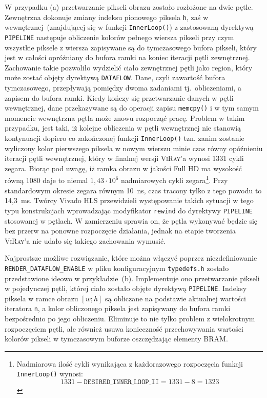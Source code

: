 \begin{enumerate}
\begin{enumerate}
\end{enumerate}
W przypadku (a) przetwarzanie pikseli obrazu zostało rozłożone na dwie pętle. Zewnętrzna dokonuje zmiany indeksu pionowego piksela \texttt{h}, zaś w wewnętrznej~(znajdującej się w funkcji \texttt{InnerLoop()}) z zastosowaną dyrektywą \texttt{PIPELINE} następuje obliczenie kolorów pełnego wiersza pikseli przy czym wszystkie piksele z wiersza zapisywane są do tymczasowego bufora pikseli, który jest w całości opróżniany do bufora ramki na koniec iteracji pętli zewnętrznej. Zachowanie takie pozwoliło wydzielić ciało zewnętrznej pętli jako region, który może zostać objęty dyrektywą \texttt{DATAFLOW}. Dane, czyli zawartość bufora tymczasowego, przepływają pomiędzy dwoma zadaniami tj.~obliczeniami, a zapisem do bufora ramki. Kiedy kończy się przetwarzanie danych w pętli wewnętrznej, dane przekazywane są do operacji zapisu \texttt{memcpy()} i w tym samym momencie wewnętrzna pętla może znowu rozpocząć pracę. Problem w takim przypadku, jest taki, iż kolejne obliczenia w pętli wewnętrznej nie stanowią kontynuacji dopiero co zakończonej funkcji \texttt{InnerLoop()} tzn. zanim zostanie wyliczony kolor pierwszego piksela w nowym wierszu minie czas równy opóźnieniu iteracji pętli wewnętrznej, który w finalnej wersji \textsc{ViRay}'a wynosi 1331 cykli zegara. Biorąc pod uwagę, iż ramka obrazu w jakości Full HD ma wysokość równą 1080 daje to niemal $1,43\cdot 10^6$ nadmiarowych cykli zegara\footnote{Nadmiarowa ilość cykli wynikająca z każdorazowego rozpoczęcia funkcji \texttt{InnerLoop()} wynosi: 
\begin{equation}
1331 - \mathtt{DESIRED\_INNER\_LOOP\_II} = 1331 - 8 = 1323
\end{equation}
}. Przy standardowym okresie zegara równym 10~ns, czas tracony tylko z tego powodu to 14,3~ms. Twórcy Vivado HLS przewidzieli występowanie takich sytuacji w tego typu konstrukcjach wprowadzając modyfikator \texttt{rewind} do dyrektywy \texttt{PIPELINE} stosowanej w pętlach. W zamierzeniu sprawia on, że pętla wykonywać będzie się bez przerw na ponowne rozpoczęcie działania, jednak na etapie tworzenia \textsc{ViRay}'a nie udało się takiego zachowania wymusić.

Najprostsze możliwe rozwiązanie, które można włączyć poprzez niezdefiniowanie \texttt{RENDER\_DATAFLOW\_ENABLE} w pliku konfiguracyjnym \texttt{typedefs.h} zostało przedstawione ideowo w przykładzie~(b). Implementuje ono przetwarzanie pikseli w pojedynczej pętli, której ciało zostało objęte dyrektywą \texttt{PIPELINE}. Indeksy piksela w ramce obrazu $[w;h]$ są obliczane na podstawie aktualnej wartości iteratora \texttt{n}, a kolor obliczonego piksela jest zapisywany do bufora ramki bezpośrednio po jego obliczeniu. Eliminuje to nie tylko problem z wielokrotnym rozpoczęciem pętli, ale również usuwa konieczność przechowywania wartości kolorów pikseli w tymczasowym buforze oszczędzając elementy BRAM. 


\end{enumerate}
